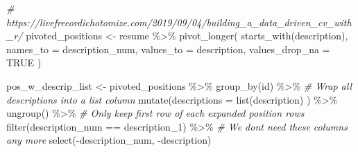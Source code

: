 \documentclass[
]{article}
\newenvironment{Shaded}{\begin{snugshade}}{\end{snugshade}}
\newcommand{\AttributeTok}[1]{\textcolor[rgb]{0.77,0.63,0.00}{#1}}
\newcommand{\CommentTok}[1]{\textcolor[rgb]{0.56,0.35,0.01}{\textit{#1}}}
\newcommand{\ConstantTok}[1]{\textcolor[rgb]{0.00,0.00,0.00}{#1}}
\newcommand{\FunctionTok}[1]{\textcolor[rgb]{0.00,0.00,0.00}{#1}}
\newcommand{\NormalTok}[1]{#1}
\newcommand{\OtherTok}[1]{\textcolor[rgb]{0.56,0.35,0.01}{#1}}
\newcommand{\SpecialCharTok}[1]{\textcolor[rgb]{0.00,0.00,0.00}{#1}}
\newcommand{\StringTok}[1]{\textcolor[rgb]{0.31,0.60,0.02}{#1}}
\begin{document}
\begin{Shaded}
\begin{Highlighting}[]
\CommentTok{\# https://livefreeordichotomize.com/2019/09/04/building\_a\_data\_driven\_cv\_with\_r/}
\NormalTok{pivoted\_positions }\OtherTok{\textless{}{-}}\NormalTok{ resume }\SpecialCharTok{\%\textgreater{}\%} 
  \FunctionTok{pivot\_longer}\NormalTok{(}
     \FunctionTok{starts\_with}\NormalTok{(}\StringTok{\textquotesingle{}description\textquotesingle{}}\NormalTok{),}
     \AttributeTok{names\_to =} \StringTok{\textquotesingle{}description\_num\textquotesingle{}}\NormalTok{,}
     \AttributeTok{values\_to =} \StringTok{\textquotesingle{}description\textquotesingle{}}\NormalTok{,}
     \AttributeTok{values\_drop\_na =} \ConstantTok{TRUE}
\NormalTok{   )}

\NormalTok{pos\_w\_descrip\_list }\OtherTok{\textless{}{-}}\NormalTok{ pivoted\_positions }\SpecialCharTok{\%\textgreater{}\%} 
  \FunctionTok{group\_by}\NormalTok{(id) }\SpecialCharTok{\%\textgreater{}\%} 
  \CommentTok{\# Wrap all descriptions into a list column}
  \FunctionTok{mutate}\NormalTok{(}\AttributeTok{descriptions =} \FunctionTok{list}\NormalTok{(description) ) }\SpecialCharTok{\%\textgreater{}\%} 
  \FunctionTok{ungroup}\NormalTok{() }\SpecialCharTok{\%\textgreater{}\%} 
  \CommentTok{\# Only keep first row of each expanded position rows}
  \FunctionTok{filter}\NormalTok{(description\_num }\SpecialCharTok{==} \StringTok{\textquotesingle{}description\_1\textquotesingle{}}\NormalTok{) }\SpecialCharTok{\%\textgreater{}\%} 
  \CommentTok{\# We don\textquotesingle{}t need these columns any more}
  \FunctionTok{select}\NormalTok{(}\SpecialCharTok{{-}}\NormalTok{description\_num, }\SpecialCharTok{{-}}\NormalTok{description)}
\end{Highlighting}
\end{Shaded}
\end{document}

